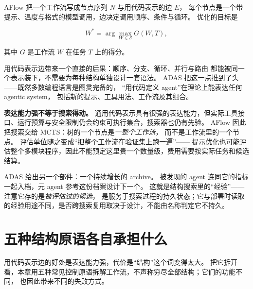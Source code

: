 AFlow 把一个工作流写成节点序列 $N$ 与用代码表示的边 $E$，
每个节点是一个带提示、温度与格式的模型调用，边决定调用顺序、条件与循环\cite{aflow-2410}。
优化的目标是

\begin{equation}
W^{*}=\arg\max_{W\in\mathcal S} G(W,T),
\label{eq:ch09-aflow}
\end{equation}

其中 $G$ 是工作流 $W$ 在任务 $T$ 上的得分\cite{aflow-2410}。

用代码表示边带来一个直接的后果：顺序、分支、循环、并行与路由
都能被同一个表示装下，不需要为每种结构单独设计一套语法。
ADAS 把这一点推到了头——既然多数编程语言是图灵完备的，
``用代码定义 agent''在理论上能表达任何 agentic system，
包括新的提示、工具用法、工作流及其组合\cite{adas-2408}。

\begin{principlebox}
\textbf{表达能力强不等于搜索得动。}
通用代码表示具有很强的表达能力，但实际工具接口、运行预算与安全限制仍会约束可执行集合，搜索器也仍有先验。
AFlow 因此把搜索交给 MCTS：树的一个节点是\emph{一整个工作流}，
而不是工作流里的一个节点\cite{aflow-2410}。
评估单位随之变成``把整个工作流在验证集上跑一遍''——
提示优化也可能评估整个多模块程序，因此不能预定这里贵一个数量级，费用需要按实际任务和候选结算。
\end{principlebox}

ADAS 给出另一个部件：一个持续增长的 archive。
被发现的 agent 连同它的指标一起入档，元 agent 参考这份档案设计下一个\cite{adas-2408}。
这就是结构搜索里的``经验''——注意它存的是\emph{被评估过的候选}，
是服务于搜索过程的持久状态；它与部署时读取的经验用途不同，是否跨搜索复用取决于设计，不能由名称判定它不持久。

\section{五种结构原语各自承担什么}
\label{sec:ch09-primitives}

用代码表示边的好处是表达能力强，代价是``结构''这个词变得太大。
把它拆开看，本章用五种常见控制原语拆解工作流，不声称穷尽全部结构；它们的功能不同，
也因此带来不同的失败方式。

